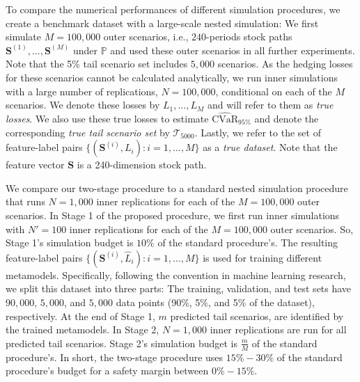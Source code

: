 \documentclass{article}
\newcommand{\CVaR}{\mbox{CVaR}}
\newcommand{\tail}{\mathcal{T}}
\newcommand{\bS}{\bm{S}}
\newcommand{\Lhat}{\widehat{L}}
\begin{document}
To compare the numerical performances of different simulation procedures, we create a benchmark dataset with a large-scale nested simulation: We first simulate $M=100\!,\!000$ outer scenarios, i.e., $240$-periods stock paths $\bS^{(1)},\ldots,\bS^{(M)}$ under $\mathbb{P}$ and used these outer scenarios in all further experiments.
Note that the 5\% tail scenario set includes $5\!,\!000$ scenarios.
As the hedging losses for these scenarios cannot be calculated analytically, we run inner simulations with a large number of replications, $N=100\!,\!000$, conditional on each of the $M$ scenarios.
We denote these losses by $L_1,\ldots,L_M$ and will refer to them as \textit{true losses}.
We also use these true losses to estimate $\widehat{\CVaR}_{95\%}$ and denote the corresponding \textit{true tail scenario set} by $\tail_{5000}$.
Lastly, we refer to the set of feature-label pairs $\{(\bS^{(i)}, L_i): i=1,\ldots,M\}$ as a \textit{true dataset}.
Note that the feature vector $\bS$ is a 240-dimension stock path.

We compare our two-stage procedure to a standard nested simulation procedure that runs $N=1\!,\!000$ inner replications for each of the $M=100\!,\!000$ outer scenarios.
In Stage 1 of the proposed procedure, we first run inner simulations with $N'=100$ inner replications for each of the $M=100\!,\!000$ outer scenarios.
So, Stage 1's simulation budget is $10\%$ of the standard procedure's.
The resulting feature-label pairs $\{(\bS^{(i)}, \Lhat_i): i=1,\ldots,M\}$ is used for training different  metamodels.
Specifically, following the convention in machine learning research, we split this dataset into three parts: The training, validation, and test sets have $90\!,\!000$, $5\!,\!000$, and $5\!,\!000$ data points (90\%, 5\%, and 5\% of the dataset), respectively.
At the end of Stage 1, $m$ predicted tail scenarios, are identified by the trained metamodels.
In Stage 2, $N=1\!,\!000$ inner replications are run for all predicted tail scenarios.
Stage 2's simulation budget is $\frac{m}{M}$ of the standard procedure's.
In short, the two-stage procedure uses $15\% - 30\%$ of the standard procedure's budget for a safety margin between $0\% - 15\%$.
\end{document}
